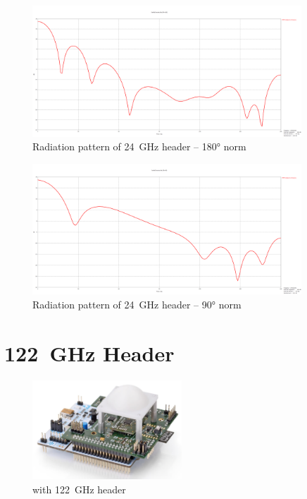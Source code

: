 \begin{figure}[h!]
  \centering
  \includegraphics[width=0.9\textwidth]{../img/farfield180.png}
  \caption[Radiation pattern of 24~GHz header -- 180° norm]{Radiation pattern of 24~GHz header -- 180° norm}
  \label{fig:farfield180}
\end{figure}

\begin{figure}[h!]
  \centering
  \includegraphics[width=0.9\textwidth]{../img/farfield90.png}
  \caption[Radiation pattern of 24~GHz header -- 90° norm]{Radiation pattern of 24~GHz header -- 90° norm}
  \label{fig:farfield90}
\end{figure}


\section{122~GHz Header}

\begin{figure}[h!]
  \centering
  \includegraphics[width=0.5\textwidth]{../img/sidar122.png}
  \caption[\sidar with 122~GHz header \cite{sidarPRO}]{\sidar with 122~GHz header}
  \label{fig:sidar122}
\end{figure}

